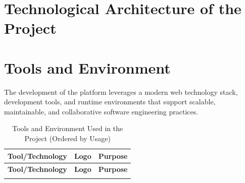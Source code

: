 \section{Technological Architecture of the Project}

\section{Tools and Environment}
The development of the platform leverages a modern web technology stack, development tools, and runtime environments that support scalable, maintainable, and collaborative software engineering practices.

\begin{longtable}{|m{3.5cm}|m{4cm}|m{6.5cm}|}
    \caption{Tools and Environment Used in the Project (Ordered by Usage)} \label{tab:tools_env_ordered} \\
    \hline
    \textbf{Tool/Technology} & \textbf{Logo} & \textbf{Purpose} \\
    \hline
    \endfirsthead
    
    \hline
    \textbf{Tool/Technology} & \textbf{Logo} & \textbf{Purpose} \\
    \hline
    \endhead
    
    \endfoot
    

\end{longtable}
